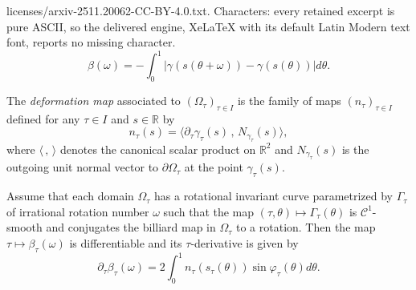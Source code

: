 \documentclass[10pt,a4paper]{amsart}
\newcommand{\RR}{\mathbb{R}}
\begin{document}
licenses/arxiv-2511.20062-CC-BY-4.0.txt. Characters: every retained excerpt is pure ASCII, so the delivered engine, XeLaTeX with its default Latin Modern text font, reports no missing character.
\begin{equation}
\label{equation:beta_inv_curve}
\beta(\omega) = -\int_0^1|\gamma(s(\theta+\omega))-\gamma(s(\theta))|d\theta.
\end{equation}

\begin{definition}
The \textit{deformation map} associated to $(\Omega_{\tau})_{\tau\in I}$ is the family of maps $(n_{\tau})_{\tau\in I}$ defined for any $\tau\in I$ and $s\in\RR$ by
\begin{equation} \label{defntau}
n_{\tau}(s) = \langle\partial_{\tau}\gamma_{\tau}(s)\,,\,N_{\gamma_{\tau}}(s)\rangle,
\end{equation}
where $\langle\,,\,\rangle$ denotes the canonical scalar product on $\RR^2$ and $N_{\gamma_{\tau}}(s)$ is the outgoing unit normal vector to $\partial\Omega_{\tau}$ at the point $\gamma_{\tau}(s)$. 
\end{definition}

\begin{proposition}
\label{proposition:first_var_beta}
Assume that each domain $\Omega_{\tau}$ has a rotational invariant curve parametrized by $\Gamma_{\tau}$ of irrational rotation number $\omega$ such that the map $(\tau,\theta)\mapsto\Gamma_{\tau}(\theta)$ is $\mathscr C^1$-smooth and conjugates the billiard map in $\Omega_{\tau}$ to a rotation. Then the map $\tau\mapsto\beta_{\tau}(\omega)$ is differentiable and its $\tau$-derivative is given by
\begin{equation}
\label{equation:beta_form1}
\partial_{\tau}\beta_{\tau}(\omega) = 2\int_0^{1}n_{\tau}(s_{\tau}(\theta))\sin\varphi_{\tau}(\theta)d\theta.
\end{equation}
\end{proposition}
\end{document}
